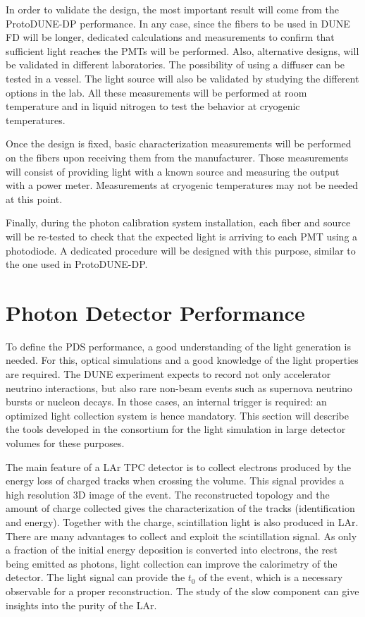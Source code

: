 In order to validate the design, the most important result will come from the ProtoDUNE-DP performance. In any case, since the fibers to be used in DUNE FD will be longer, dedicated calculations and measurements to confirm that sufficient light reaches the PMTs will be performed. Also, alternative designs, will be validated in different laboratories. The possibility of using a diffuser can be tested in a vessel. The light source will also be validated by studying the different options in the lab. All these measurements will be performed at room temperature and in liquid nitrogen to test the behavior at cryogenic temperatures.

Once the design is fixed, basic characterization measurements will be performed on the fibers upon receiving them from the manufacturer. Those measurements will consist of providing light with a known source and measuring the output with a power meter. Measurements at cryogenic temperatures may not be needed at this point.

Finally, during the photon calibration system installation, each fiber and source will be re-tested to check that the expected light is arriving to each PMT using a photodiode. A dedicated procedure will be designed with this purpose, similar to the one used in ProtoDUNE-DP.

\section{Photon Detector Performance}
\label{sec:fddp-pd-6}

To define the PDS performance, a good understanding of the light generation is needed. For this, optical simulations and a good knowledge of the light properties are required. The DUNE experiment expects to record not only accelerator neutrino interactions, but also rare non-beam events such as supernova neutrino bursts or nucleon decays. In those cases, an internal trigger is required: an optimized light collection system is hence mandatory. This section will describe the tools developed in the consortium for the light simulation in large detector volumes for these purposes.

The main feature of a LAr TPC detector is to collect electrons produced by the energy loss of charged tracks when crossing the volume. This signal provides a high resolution 3D image of the event. The reconstructed topology and the amount of charge collected gives the characterization of the tracks (identification and energy). Together with the charge, scintillation light is also produced in LAr. There are many advantages to collect and exploit the scintillation signal. As only a fraction of the initial energy deposition is converted into electrons, the rest being emitted as photons, light collection can improve the calorimetry of the detector. The light signal can provide the $t_0$ of the event, which is a necessary observable for a proper reconstruction. The study of the slow component can give insights into the purity of the LAr. 

